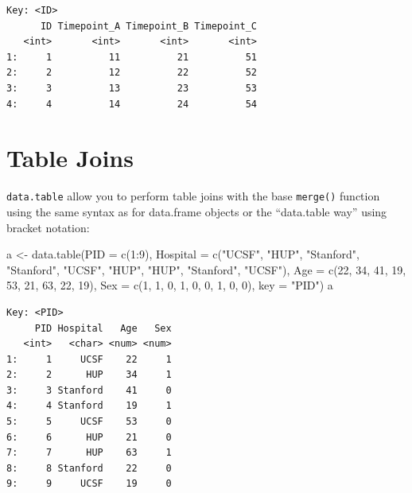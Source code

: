 \documentclass[
]{book}
\newenvironment{Shaded}{\begin{snugshade}}{\end{snugshade}}
\newcommand{\AttributeTok}[1]{\textcolor[rgb]{0.77,0.63,0.00}{#1}}
\newcommand{\DecValTok}[1]{\textcolor[rgb]{0.00,0.00,0.81}{#1}}
\newcommand{\FunctionTok}[1]{\textcolor[rgb]{0.00,0.00,0.00}{#1}}
\newcommand{\NormalTok}[1]{#1}
\newcommand{\OtherTok}[1]{\textcolor[rgb]{0.56,0.35,0.01}{#1}}
\newcommand{\SpecialCharTok}[1]{\textcolor[rgb]{0.00,0.00,0.00}{#1}}
\newcommand{\StringTok}[1]{\textcolor[rgb]{0.31,0.60,0.02}{#1}}
\begin{document}
\begin{verbatim}
Key: <ID>
      ID Timepoint_A Timepoint_B Timepoint_C
   <int>       <int>       <int>       <int>
1:     1          11          21          51
2:     2          12          22          52
3:     3          13          23          53
4:     4          14          24          54
\end{verbatim}

\hypertarget{table-joins}{%
\section{Table Joins}\label{table-joins}}

\texttt{data.table} allow you to perform table joins with the base \texttt{merge()} function using the same syntax as for data.frame objects or the ``data.table way'' using bracket notation:

\begin{Shaded}
\begin{Highlighting}[]
\NormalTok{a }\OtherTok{\textless{}{-}} \FunctionTok{data.table}\NormalTok{(}\AttributeTok{PID =} \FunctionTok{c}\NormalTok{(}\DecValTok{1}\SpecialCharTok{:}\DecValTok{9}\NormalTok{),}
                \AttributeTok{Hospital =} \FunctionTok{c}\NormalTok{(}\StringTok{"UCSF"}\NormalTok{, }\StringTok{"HUP"}\NormalTok{, }\StringTok{"Stanford"}\NormalTok{, }
                             \StringTok{"Stanford"}\NormalTok{, }\StringTok{"UCSF"}\NormalTok{, }\StringTok{"HUP"}\NormalTok{, }
                             \StringTok{"HUP"}\NormalTok{, }\StringTok{"Stanford"}\NormalTok{, }\StringTok{"UCSF"}\NormalTok{),}
                \AttributeTok{Age =} \FunctionTok{c}\NormalTok{(}\DecValTok{22}\NormalTok{, }\DecValTok{34}\NormalTok{, }\DecValTok{41}\NormalTok{, }\DecValTok{19}\NormalTok{, }\DecValTok{53}\NormalTok{, }\DecValTok{21}\NormalTok{, }\DecValTok{63}\NormalTok{, }\DecValTok{22}\NormalTok{, }\DecValTok{19}\NormalTok{),}
                \AttributeTok{Sex =} \FunctionTok{c}\NormalTok{(}\DecValTok{1}\NormalTok{, }\DecValTok{1}\NormalTok{, }\DecValTok{0}\NormalTok{, }\DecValTok{1}\NormalTok{, }\DecValTok{0}\NormalTok{, }\DecValTok{0}\NormalTok{, }\DecValTok{1}\NormalTok{, }\DecValTok{0}\NormalTok{, }\DecValTok{0}\NormalTok{),}
                \AttributeTok{key =} \StringTok{"PID"}\NormalTok{)}
\NormalTok{a}
\end{Highlighting}
\end{Shaded}

\begin{verbatim}
Key: <PID>
     PID Hospital   Age   Sex
   <int>   <char> <num> <num>
1:     1     UCSF    22     1
2:     2      HUP    34     1
3:     3 Stanford    41     0
4:     4 Stanford    19     1
5:     5     UCSF    53     0
6:     6      HUP    21     0
7:     7      HUP    63     1
8:     8 Stanford    22     0
9:     9     UCSF    19     0
\end{verbatim}
\end{document}

